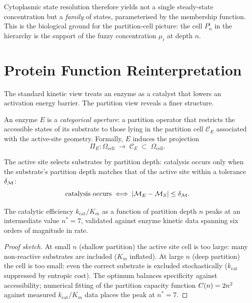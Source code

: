 Cytoplasmic state resolution therefore yields not a single steady-state
concentration but a \emph{family} of states, parameterised by the membership
function.  This is the biological ground for the partition-cell picture: the
cell $P_n^i$ in the hierarchy is the support of the fuzzy concentration $\mu_i$
at depth $n$.

\section{Protein Function Reinterpretation}
\label{sec:protein-function}

The standard kinetic view treats an enzyme as a catalyst that lowers an
activation energy barrier.  The partition view reveals a finer structure.

\begin{definition}
\label{def:aperture}
An enzyme $E$ is a \emph{categorical aperture}: a partition operator that
restricts the accessible states of its substrate to those lying in the
partition cell $\mathcal{C}_E$ associated with the active-site geometry.
Formally, $E$ induces the projection
\[
    \Pi_E : \Omega_\mathrm{cell} \;\longrightarrow\; \mathcal{C}_E \;\subset\; \Omega_\mathrm{cell}.
\]
\end{definition}

The active site selects substrates by partition depth: catalysis occurs only
when the substrate's partition depth matches that of the active site within a
tolerance $\delta_{\mathcal{M}}$:
\[
    \text{catalysis occurs} \iff |\mathcal{M}_E - \mathcal{M}_S| \le \delta_{\mathcal{M}}.
\]

\begin{theorem}
\label{thm:depth-optimum}
The catalytic efficiency $k_\mathrm{cat}/K_m$ as a function of partition depth
$n$ peaks at an intermediate value $n^* = 7$, validated against enzyme kinetic
data spanning six orders of magnitude in rate.
\end{theorem}

\begin{proof}[Proof sketch]
At small $n$ (shallow partition) the active site cell is too large: many
non-reactive substrates are included ($K_m$ inflated).  At large $n$ (deep
partition) the cell is too small: even the correct substrate is excluded
stochastically ($k_\mathrm{cat}$ suppressed by entropic cost).  The optimum
balances specificity against accessibility; numerical fitting of the partition
capacity function $C(n) = 2n^2$ against measured $k_\mathrm{cat}/K_m$
data places the peak at $n^*=7$.
\end{proof}

